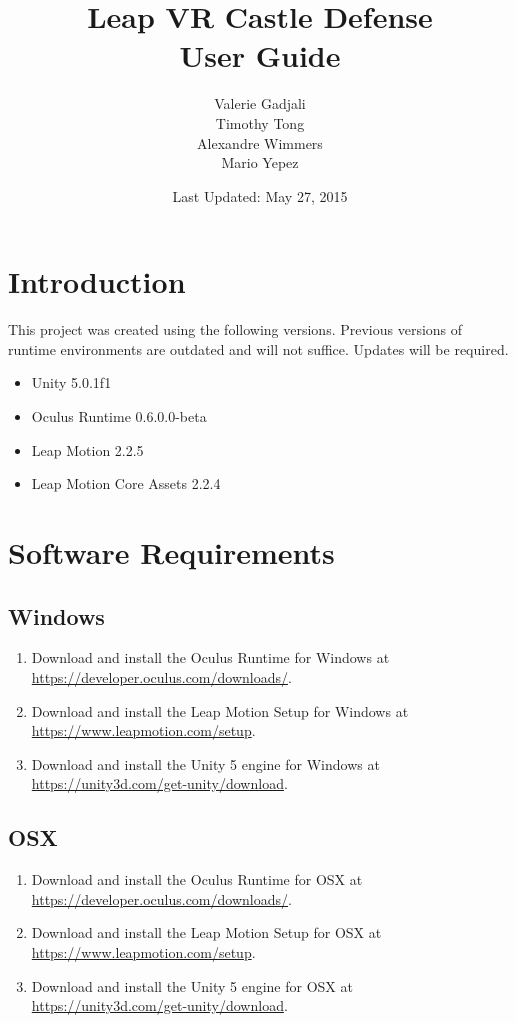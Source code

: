 \documentclass[a4paper]{refart}
\title{Leap VR Castle Defense\\User Guide}
\author{Valerie Gadjali\\
	Timothy Tong\\
	Alexandre Wimmers\\
	Mario Yepez
}
\date{Last Updated: May 27, 2015}
\begin{document}
\maketitle

\tableofcontents

\newpage

\section{Introduction}

This project was created using the following versions. Previous versions of runtime environments are outdated and will not suffice. Updates will be required.

\begin{itemize}
	\item Unity 5.0.1f1
	\item Oculus Runtime 0.6.0.0-beta
	\item Leap Motion 2.2.5
	\item Leap Motion Core Assets 2.2.4
\end{itemize}

\section{Software Requirements}

\subsection{Windows}

\begin{enumerate}
	\item Download and install the Oculus Runtime for Windows at\\ \url{https://developer.oculus.com/downloads/}.
	\item Download and install the Leap Motion Setup for Windows at\\ \url{https://www.leapmotion.com/setup}.
	\item Download and install the Unity 5 engine for Windows at\\ \url{https://unity3d.com/get-unity/download}.
\end{enumerate}

\subsection{OSX}

\begin{enumerate}
	\item Download and install the Oculus Runtime for OSX at\\ \url{https://developer.oculus.com/downloads/}.
	\item Download and install the Leap Motion Setup for OSX at\\ \url{https://www.leapmotion.com/setup}.
	\item Download and install the Unity 5 engine for OSX at\\ \url{https://unity3d.com/get-unity/download}.
\end{enumerate}
\end{document}

